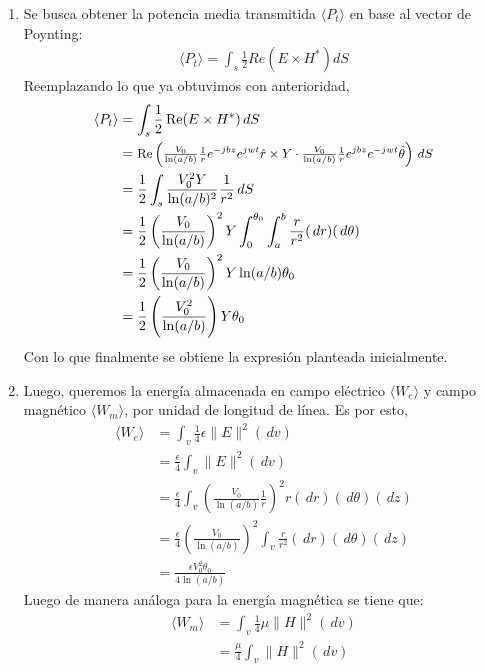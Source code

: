 \documentclass[
  11pt,
  letterpaper,
   addpoints,
   answers
  ]{exam}
\begin{document}
\begin{questions}
\begin{solution}
\begin{enumerate}
\item Se busca obtener la potencia media transmitida $ \langle P_t \rangle $ en base al vector de Poynting:
\begin{align}
    \langle P_t \rangle = \int_{s} \frac{1}{2}Re(E \times H^{*}) dS
\end{align}
Reemplazando lo que ya obtuvimos con anterioridad,
\begin{align}
    \langle P_{t} \rangle &= \int_{s} \frac{1}{2}\operatorname{Re}(E \times H^{*}) \,dS\\
             &= \mbox{\small{$\operatorname{Re}\left( \frac{V_{0}}{\ln(a/b)} \frac{1}{r} e^{-jbz}e^{jwt}\hat{r} \times Y \cdot \frac{V_{0}}{\ln(a/b)} \frac{1}{r} e^{jbz}e^{-jwt}\hat{\theta} \right) \,dS$}}\\
             &= \frac{1}{2}\int_{s} \frac{V_{0}^{2}Y}{\ln(a/b)^{2}}\frac{1}{r^{2}} \,dS\\
             &= \frac{1}{2}\left(\frac{V_{0}}{\ln(a/b)}\right)^{2}Y \int_{0}^{\theta_{0}}\int_{a}^{b} \frac{r}{r^{2}} (\,dr)(\,d\theta)\\
             &= \frac{1}{2}\left(\frac{V_{0}}{\ln(a/b)}\right)^{2}Y \ln(a/b)\theta_{0}\\
             &= \frac{1}{2}\left(\frac{V_{0}^{2}}{\ln(a/b)}\right)Y \theta_{0}
\end{align}
Con lo que finalmente se obtiene la expresión planteada inicialmente.
\item Luego, queremos la energía almacenada en campo eléctrico $\langle W_{e} \rangle$ y campo magnético $\langle W_{m} \rangle$, por unidad de longitud de línea. Es por esto,
\begin{align}
    \langle W_{e} \rangle &= \int_{v} \frac{1}{4}\epsilon\|E\|^{2}(\,dv)\\
    &= \frac{\epsilon}{4}\int_{v}\|E\|^{2}(\,dv)\\
    &=\frac{\epsilon}{4}\int_{v} \left( \frac{V_{0}}{\ln(a/b)} \frac{1}{r}\right)^{2} r(\,dr)(\,d\theta)(\,dz)\\
    &= \frac{\epsilon}{4}\left( \frac{V_{0}}{\ln(a/b)}\right)^{2}\int_{v} \frac{r}{r^{2}}(\,dr)(\,d\theta)(\,dz)\\
    &= \frac{\epsilon V_{0}^{2}\theta_{0} }{4\ln(a/b)}
\end{align}
Luego de manera análoga para la energía magnética se tiene que:
\begin{align}
    \langle W_{m} \rangle &= \int_{v} \frac{1}{4}\mu\|H\|^{2}(\,dv)\\
    &= \frac{\mu}{4}\int_{v}\|H\|^{2}(\,dv)\\

\end{align}
\end{enumerate}
\end{solution}
\end{questions}
\end{document}
